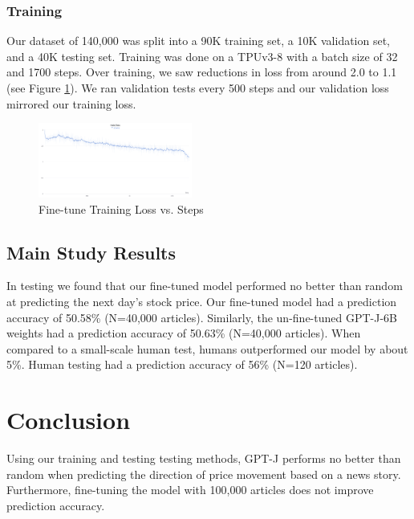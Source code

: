 \documentclass[conference]{IEEEtran}
\begin{document}
\subsubsection{Training}
Our dataset of 140,000 was split into a 90K training set, a 10K validation set, and a 40K testing set. Training was done on a TPUv3-8 with a batch size of 32 and 1700 steps. Over training, we saw reductions in loss from around 2.0 to 1.1 (see Figure \ref{fig:loss}). We ran validation tests every 500 steps and our validation loss mirrored our training loss.
\begin{figure}[ht]
    \centering
    \includegraphics[width=0.45\textwidth]{loss.png}
    \caption{Fine-tune Training Loss vs. Steps}
    \label{fig:loss}
\end{figure}
\subsection{Main Study Results}
In testing we found that our fine-tuned model performed no better than random at predicting the next day's stock price. Our fine-tuned model had a prediction accuracy of 50.58\% (N=40,000 articles). Similarly, the un-fine-tuned GPT-J-6B weights had a prediction accuracy of 50.63\% (N=40,000 articles). When compared to a small-scale human test, humans outperformed our model by about 5\%. Human testing had a prediction accuracy of 56\% (N=120 articles).

\section{Conclusion}
Using our training and testing testing methods, GPT-J performs no better than random when predicting the direction of price movement based on a news story. Furthermore, fine-tuning the model with 100,000 articles does not improve prediction accuracy. 
\end{document}
